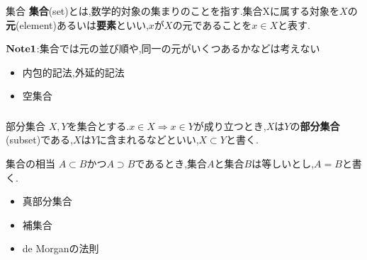 \documentclass[dvipdfmx,b4j]{jsarticle}
\begin{document}
\begin{definition}{集合}{}
\textbf{集合}(set)とは,数学的対象の集まりのことを指す.集合Xに属する対象を$X$の\textbf{元}(element)あるいは\textbf{要素}といい,$x$が$X$の元であることを$x\in X$と表す.
\end{definition}
\noindent $\bf{Note1}$:集合では元の並び順や,同一の元がいくつあるかなどは考えない
\begin{itemize}
\item 内包的記法,外延的記法
\item 空集合
\end{itemize}

\subsubsection{}
\begin{definition}{部分集合}{}
$X,Y$を集合とする.$x\in X\Longrightarrow x\in Y$が成り立つとき,$X$は$Y$の\textbf{部分集合}(subset)である,$X$は$Y$に含まれるなどといい,$X\subset Y$と書く.
\end{definition}
\begin{definition}{集合の相当}{}
$A\subset B $かつ$A\supset B$であるとき,集合$A$と集合$B$は等しいとし,$A = B $と書く.
\end{definition}
\begin{itemize}
    \item 真部分集合
    \item 補集合
    \item de Morganの法則
\end{itemize}

\end{document}
